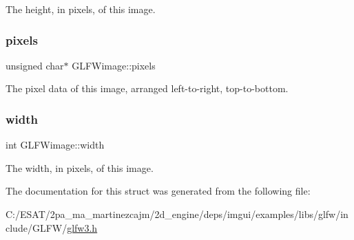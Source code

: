 The height, in pixels, of this image. \mbox{\label{struct_g_l_f_wimage_a0c532a5c2bb715555279b7817daba0fb}} 
\subsubsection{\texorpdfstring{pixels}{pixels}}
{\footnotesize\ttfamily unsigned char$\ast$ G\+L\+F\+Wimage\+::pixels}

The pixel data of this image, arranged left-\/to-\/right, top-\/to-\/bottom. \mbox{\label{struct_g_l_f_wimage_af6a71cc999fe6d3aea31dd7e9687d835}} 
\subsubsection{\texorpdfstring{width}{width}}
{\footnotesize\ttfamily int G\+L\+F\+Wimage\+::width}

The width, in pixels, of this image. 

The documentation for this struct was generated from the following file\+:\begin{DoxyCompactItemize}
\item 
C\+:/\+E\+S\+A\+T/2pa\+\_\+ma\+\_\+martinezcajm/2d\+\_\+engine/deps/imgui/examples/libs/glfw/include/\+G\+L\+F\+W/\hyperlink{glfw3_8h}{glfw3.\+h}\end{DoxyCompactItemize}
